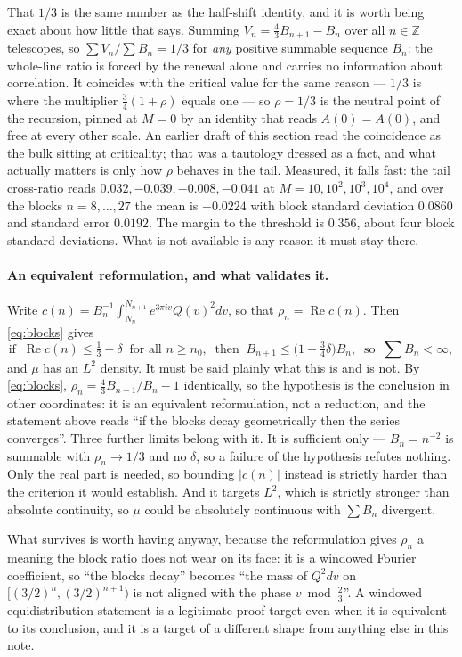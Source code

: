\documentclass[11pt]{article}
\theoremstyle{remark}
\begin{document}
That $1/3$ is the same number as the half-shift identity, and it is worth being exact about how little
that says. Summing $V_n=\tfrac43B_{n+1}-B_n$ over all $n\in\mathbb Z$ telescopes, so
$\sum V_n/\sum B_n=1/3$ for \emph{any} positive summable sequence $B_n$: the whole-line ratio is forced
by the renewal alone and carries no information about correlation. It coincides with the critical value
for the same reason --- $1/3$ is where the multiplier $\tfrac34(1+\rho)$ equals one --- so $\rho=1/3$ is
the neutral point of the recursion, pinned at $M=0$ by an identity that reads $A(0)=A(0)$, and free at
every other scale. An earlier draft of this section read the coincidence as the bulk sitting at
criticality; that was a tautology dressed as a fact, and what actually matters is only how $\rho$
behaves in the tail. Measured, it falls fast: the tail cross-ratio reads $0.032,-0.039,-0.008,-0.041$ at
$M=10,10^2,10^3,10^4$, and over the blocks $n=8,\dots,27$ the mean is $-0.0224$ with block standard
deviation $0.0860$ and standard error $0.0192$. The margin to the threshold is $0.356$, about four block
standard deviations. What is not available is any reason it must stay there.
\paragraph{An equivalent reformulation, and what validates it.} Write
$c(n)=B_n^{-1}\int_{N_n}^{N_{n+1}}e^{3\pi iv}Q(v)^2dv$, so that $\rho_n=\operatorname{Re}c(n)$. Then
\eqref{eq:blocks} gives
\[
  \text{if }\ \operatorname{Re}c(n)\le\tfrac13-\delta\ \text{ for all }n\ge n_0,\ \text{ then }\
  B_{n+1}\le\bigl(1-\tfrac34\delta\bigr)B_n,\ \text{ so }\ \sum B_n<\infty,
\]
and $\mu$ has an $L^2$ density. It must be said plainly what this is and is not. By \eqref{eq:blocks},
$\rho_n=\tfrac43B_{n+1}/B_n-1$ identically, so the hypothesis is the conclusion in other coordinates: it
is an equivalent reformulation, not a reduction, and the statement above reads ``if the blocks decay
geometrically then the series converges''. Three further limits belong with it. It is sufficient only
--- $B_n=n^{-2}$ is summable with $\rho_n\to1/3$ and no $\delta$, so a failure of the hypothesis refutes
nothing. Only the real part is needed, so bounding $|c(n)|$ instead is strictly harder than the criterion
it would establish. And it targets $L^2$, which is strictly stronger than absolute continuity, so $\mu$
could be absolutely continuous with $\sum B_n$ divergent.

What survives is worth having anyway, because the reformulation gives $\rho_n$ a meaning the block ratio
does not wear on its face: it is a windowed Fourier coefficient, so ``the blocks decay'' becomes ``the
mass of $Q^2dv$ on $[(3/2)^n,(3/2)^{n+1})$ is not aligned with the phase $v\bmod\tfrac23$''. A windowed
equidistribution statement is a legitimate proof target even when it is equivalent to its conclusion, and
it is a target of a different shape from anything else in this note.
\end{document}
